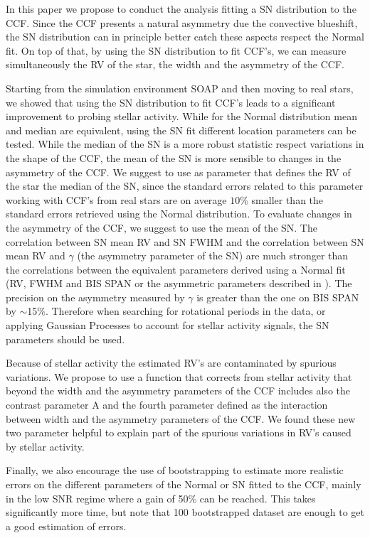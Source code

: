 \documentclass[11pt, oneside]{article}
\begin{document}
In this paper we propose to conduct the analysis fitting a SN distribution to the CCF. Since the CCF presents a natural asymmetry due the convective blueshift, the SN distribution can in principle better catch these aspects respect the Normal fit. On top of that, by using the SN distribution to fit CCF's, we can measure simultaneously the RV of the star, the width and the asymmetry of the CCF.

Starting from the simulation environment SOAP and then moving to real stars, we showed that using the SN distribution to fit CCF's leads to a significant improvement to probing stellar activity. While for the Normal distribution mean and median are equivalent, using the SN fit different location parameters can be tested. While the median of the SN is a more robust statistic respect variations in the shape of the CCF, the mean of the SN is more sensible to changes in the asymmetry of the CCF. We suggest to use as parameter that defines the RV of the star the median of the SN, since the standard errors related to this parameter working with CCF's from real stars are on average $10\%$ smaller than the standard errors retrieved using the Normal distribution. To evaluate changes in the asymmetry of the CCF, we suggest to use the mean of the SN. The correlation between SN mean RV and SN FWHM and the correlation between SN mean RV and $\gamma$ (the asymmetry parameter of the SN) are much stronger than the correlations between the equivalent parameters derived using a Normal fit (RV, FWHM and BIS SPAN or the asymmetric parameters described in \citet{Figueira-2013}). The precision on the asymmetry measured by $\gamma$ is greater than the one on BIS SPAN by $\sim$15\%. Therefore when searching for rotational periods in the data, or applying Gaussian Processes to account for stellar activity signals, the SN parameters should be used.

Because of stellar activity the estimated RV's are contaminated by spurious variations. We propose to use a function that corrects from stellar activity that beyond the width and the asymmetry parameters of the CCF includes also the contrast parameter A and the fourth parameter defined as the interaction between width and the asymmetry parameters of the CCF. We found these new two parameter helpful to explain part of the spurious variations in RV's caused by stellar activity.

Finally, we also encourage the use of bootstrapping to estimate more realistic errors on the different parameters of the Normal or SN fitted to the CCF, mainly in the low SNR regime where a gain of 50\% can be reached. This takes significantly more time, but note that 100 bootstrapped dataset are enough to get a good estimation of errors.
\end{document}
